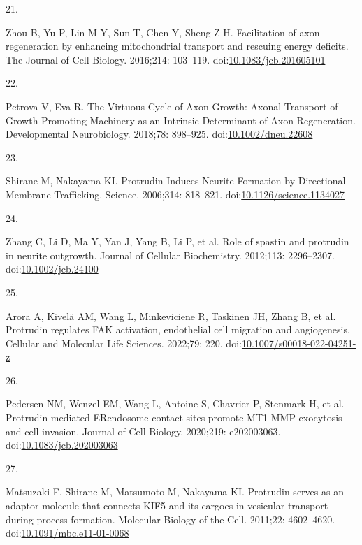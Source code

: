 \documentclass[
  12pt,
  a4paper,
]{book}
\newlength{\cslhangindent}
\newlength{\csllabelwidth}
\newlength{\cslentryspacingunit} %
\newenvironment{CSLReferences}[2] %
 {%
  \setlength{\parindent}{0pt}
  \ifodd #1
  \let\oldpar\par
  \def\par{\hangindent=\cslhangindent\oldpar}
  \fi
  \setlength{\parskip}{#2\cslentryspacingunit}
 }%
 {}
\newcommand{\CSLLeftMargin}[1]{\parbox[t]{\csllabelwidth}{#1}}
\newcommand{\CSLRightInline}[1]{\parbox[t]{\linewidth - \csllabelwidth}{#1}\break}
\begin{document}
\begin{CSLReferences}{0}{0}
\leavevmode{}%
\CSLLeftMargin{21. }%
\CSLRightInline{Zhou B, Yu P, Lin M-Y, Sun T, Chen Y, Sheng Z-H. Facilitation of axon regeneration by enhancing mitochondrial transport and rescuing energy deficits. The Journal of Cell Biology. 2016;214: 103--119. doi:\href{https://doi.org/10.1083/jcb.201605101}{10.1083/jcb.201605101}}

\leavevmode{}%
\CSLLeftMargin{22. }%
\CSLRightInline{Petrova V, Eva R. The {Virtuous Cycle} of {Axon Growth}: {Axonal Transport} of {Growth-Promoting Machinery} as an {Intrinsic Determinant} of {Axon Regeneration}. Developmental Neurobiology. 2018;78: 898--925. doi:\href{https://doi.org/10.1002/dneu.22608}{10.1002/dneu.22608}}

\leavevmode{}%
\CSLLeftMargin{23. }%
\CSLRightInline{Shirane M, Nakayama KI. Protrudin {Induces Neurite Formation} by {Directional Membrane Trafficking}. Science. 2006;314: 818--821. doi:\href{https://doi.org/10.1126/science.1134027}{10.1126/science.1134027}}

\leavevmode{}%
\CSLLeftMargin{24. }%
\CSLRightInline{Zhang C, Li D, Ma Y, Yan J, Yang B, Li P, et al. Role of spastin and protrudin in neurite outgrowth. Journal of Cellular Biochemistry. 2012;113: 2296--2307. doi:\href{https://doi.org/10.1002/jcb.24100}{10.1002/jcb.24100}}

\leavevmode{}%
\CSLLeftMargin{25. }%
\CSLRightInline{Arora A, Kivelä AM, Wang L, Minkeviciene R, Taskinen JH, Zhang B, et al. Protrudin regulates {FAK} activation, endothelial cell migration and angiogenesis. Cellular and Molecular Life Sciences. 2022;79: 220. doi:\href{https://doi.org/10.1007/s00018-022-04251-z}{10.1007/s00018-022-04251-z}}

\leavevmode{}%
\CSLLeftMargin{26. }%
\CSLRightInline{Pedersen NM, Wenzel EM, Wang L, Antoine S, Chavrier P, Stenmark H, et al. Protrudin-mediated {ER}\textendash endosome contact sites promote {MT1-MMP} exocytosis and cell invasion. Journal of Cell Biology. 2020;219: e202003063. doi:\href{https://doi.org/10.1083/jcb.202003063}{10.1083/jcb.202003063}}

\leavevmode{}%
\CSLLeftMargin{27. }%
\CSLRightInline{Matsuzaki F, Shirane M, Matsumoto M, Nakayama KI. Protrudin serves as an adaptor molecule that connects {KIF5} and its cargoes in vesicular transport during process formation. Molecular Biology of the Cell. 2011;22: 4602--4620. doi:\href{https://doi.org/10.1091/mbc.e11-01-0068}{10.1091/mbc.e11-01-0068}}


\end{CSLReferences}
\end{document}
